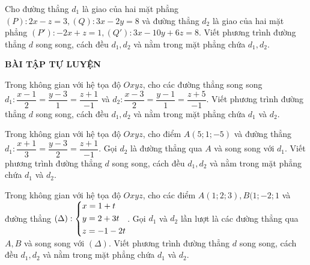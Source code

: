 \begin{vd}%
	Cho đường thẳng $d_1 $ là giao của hai mặt phẳng $(P): 2x-z=3, (Q): 3x-2y=8$ và đường thẳng $d_2$ là giao của hai mặt phẳng $(P'): -2x+z=1, (Q'): 3x-10y+6z=8$. Viết phương trình đường thẳng $d$ song song, cách đều $d_1, d_2$  và  nằm trong mặt phẳng chứa $d_1,d_2$.
\end{vd}
\begin{center}
\textbf{BÀI TẬP TỰ LUYỆN}
\end{center}
\begin{bt}%
Trong không gian với hệ tọa độ $Oxyz$, cho các đường thẳng song song $d_1: \dfrac{x-1}{2}=\dfrac{y-3}{1}=\dfrac{z+1}{-1}$ và $d_2: \dfrac{x-3}{2}=\dfrac{y-1}{1}=\dfrac{z+5}{-1}$. Viết phương trình đường thẳng $d$ song song, cách đều $d_1, d_2$ và nằm trong mặt phẳng chứa $d_1$ và $d_2$.
\end{bt}
\begin{bt}%
Trong không gian với hệ tọa độ $Oxyz$, cho điểm $A(5;1;-5)$ và đường thẳng $d_1: \dfrac{x+1}{3}=\dfrac{y-3}{2}=\dfrac{z+1}{-1}$. Gọi $d_2$ là đường thẳng qua $A$ và song song với $d_1$. Viết phương trình đường thẳng $d$ song song, cách đều $d_1, d_2$ và nằm trong mặt phẳng chứa $d_1$ và $d_2$.
\end{bt}
\begin{bt}%
Trong không gian với hệ tọa độ $Oxyz$, cho các điểm $A(1;2;3), B(1;-2;1$ và đường thẳng $(\Delta): \left\{\begin{aligned}&x=1+t\\&y=2+3t\\&z=-1-2t\end{aligned}\right.$. Gọi $d_1$ và $d_2$ lần lượt là các đường thẳng qua $A, B$ và song song với $(\Delta)$. Viết phương trình đường thẳng $d$ song song, cách đều $d_1, d_2$ và nằm trong mặt phẳng chứa $d_1$ và $d_2$.
\end{bt}
